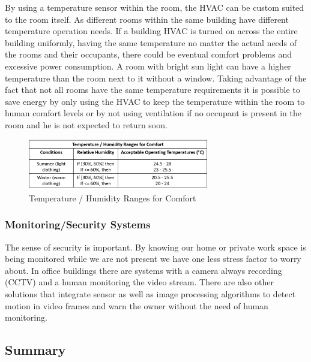 
By using a temperature sensor within the room, the \ac{HVAC} can be custom suited to the room itself. As different rooms within the same building have different temperature operation needs. If a building HVAC is turned on across the entire building uniformly, having the same temperature no matter the actual needs of the rooms and their occupants, there could be eventual comfort problems and excessive power consumption. A room with bright sun light can have a higher temperature than the room next to it without a window. Taking advantage of the fact that not all rooms have the same temperature requirements it is possible to save energy by only using the HVAC to keep the temperature within the room to human comfort levels or by not using ventilation if no occupant is present in the room and he is not expected to return soon.




\begin{figure}[h]
\centering
\includegraphics[width=0.7\textwidth]{Figures/tabela_temperatura}
\caption{Temperature / Humidity Ranges for Comfort}
\label{tab_temperature}
\end{figure}


\subsubsection{Monitoring/Security Systems}

The sense of security is important. By knowing our home or private work space is being monitored while we are not present we have one less stress factor to worry about.
In office buildings there are systems with a camera always recording (CCTV)\cite{livro_automation2} and a human monitoring the video stream. There are also other solutions that integrate sensor as well as image processing algorithms\cite{video_survailance1} to detect motion in video frames and warn the owner without the need of human monitoring. 




\subsection{Summary}


